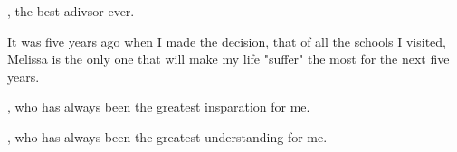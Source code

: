 
, the best adivsor ever.

It was five years ago when I made the decision, that of all the schools I visited, Melissa is the only one that will make my life "suffer" the most for the next five years.



, who has always been the greatest insparation for me.

, who has always been the greatest understanding for me.
